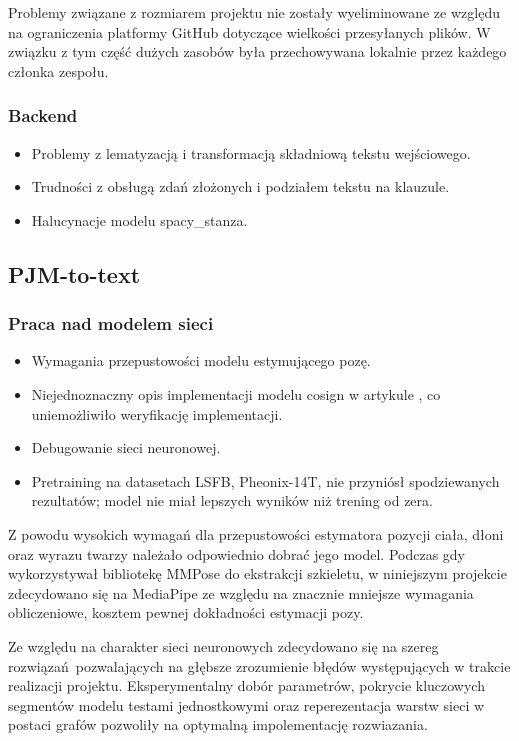 \documentclass[12pt]{article}
\begin{document}
Problemy związane z rozmiarem projektu nie zostały wyeliminowane ze względu na ograniczenia platformy GitHub dotyczące wielkości przesyłanych plików. W związku z tym część dużych zasobów była przechowywana lokalnie przez każdego członka zespołu.

\subsubsection{Backend}

\begin{itemize}
    \item Problemy z lematyzacją i transformacją składniową tekstu wejściowego.
    \item Trudności z obsługą zdań złożonych i podziałem tekstu na klauzule.
    \item Halucynacje modelu spacy\_stanza.
\end{itemize}

\subsection{PJM-to-text}

\subsubsection{Praca nad modelem sieci}
\begin{itemize}
    \item Wymagania przepustowości modelu estymującego pozę.
    \item Niejednoznaczny opis implementacji modelu cosign w artykule \cite{cosign}, co uniemożliwiło weryfikację implementacji.
    \item Debugowanie sieci neuronowej.
    \item Pretraining na datasetach LSFB, Pheonix-14T, nie przyniósł spodziewanych rezultatów; model nie miał lepszych wyników niż trening od zera.
\end{itemize}

Z powodu wysokich wymagań dla przepustowości estymatora pozycji ciała, dłoni oraz wyrazu twarzy należało odpowiednio dobrać jego model. Podczas gdy \cite{cosign} wykorzystywał bibliotekę MMPose do ekstrakcji szkieletu, w niniejszym projekcie zdecydowano się na MediaPipe \cite{mediapipe} ze względu na znacznie mniejsze wymagania obliczeniowe, kosztem pewnej dokładności estymacji pozy. 

Ze względu na charakter sieci neuronowych zdecydowano się na szereg rozwiązań pozwalających na głębsze zrozumienie błędów występujących w trakcie realizacji projektu. Eksperymentalny dobór parametrów, pokrycie kluczowych segmentów modelu testami jednostkowymi oraz reperezentacja warstw sieci w postaci grafów pozwoliły na optymalną impolementację rozwiazania.
\end{document}

